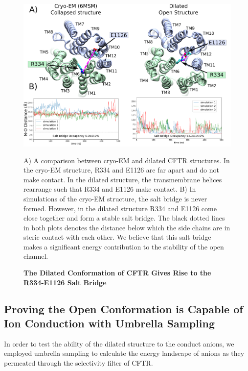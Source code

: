 \begin{figure}
	\begin{center}
		\includegraphics[width=1\textwidth]{figures/opening/salt_bridge_E1126_R334_figure.pdf}
	\end{center}
	\captionsetup{singlelinecheck = false, justification=raggedright}
	\caption[The Dilated Conformation of CFTR Gives Rise to the R334-E1126 Salt Bridge] {\textbf{The Dilated Conformation of CFTR Gives Rise to the R334-E1126 Salt Bridge}}{A) A comparison between cryo-EM and dilated CFTR structures. In the cryo-EM structure, R334 and E1126 are far apart and do not make contact. In the dilated structure, the transmembrane helices rearrange such that R334 and E1126 make contact. B) In simulations of the cryo-EM structure, the salt bridge is never formed. However, in the dilated structure R334 and E1126 come close together and form a stable salt bridge. The black dotted lines in both plots denotes the distance below which the side chains are in steric contact with each other. We believe that this salt bridge makes a significant energy contribution to the stability of the open channel. }
	\label{salt_bridge_fig}
\end{figure}

\subsection{Proving the Open Conformation is Capable of Ion Conduction with Umbrella Sampling}

In order to test the ability of the dilated structure to the conduct anions, we employed umbrella sampling to calculate the energy landscape of anions as they permeated through the selectivity filter of CFTR. 


